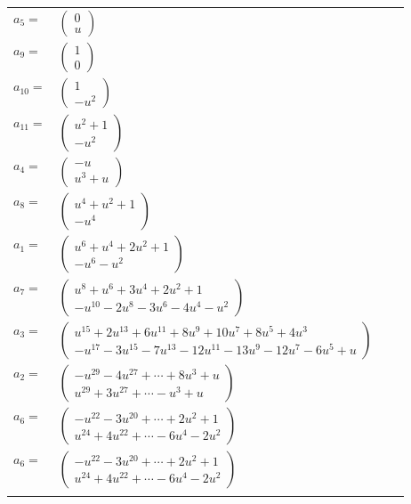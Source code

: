 \documentclass[1p]{elsarticle_modified}
\theoremstyle{definition}
\begin{document}
\begin{tabular}{m{7pt} m{180pt} m{7pt} m{180pt} }
\flushright $a_{5}=$&$\begin{pmatrix}0\\u\end{pmatrix}$ \\
\flushright $a_{9}=$&$\begin{pmatrix}1\\0\end{pmatrix}$ \\
\flushright $a_{10}=$&$\begin{pmatrix}1\\- u^2\end{pmatrix}$ \\
\flushright $a_{11}=$&$\begin{pmatrix}u^2+1\\- u^2\end{pmatrix}$ \\
\flushright $a_{4}=$&$\begin{pmatrix}- u\\u^3+u\end{pmatrix}$ \\
\flushright $a_{8}=$&$\begin{pmatrix}u^4+u^2+1\\- u^4\end{pmatrix}$ \\
\flushright $a_{1}=$&$\begin{pmatrix}u^6+u^4+2 u^2+1\\- u^6- u^2\end{pmatrix}$ \\
\flushright $a_{7}=$&$\begin{pmatrix}u^8+u^6+3 u^4+2 u^2+1\\- u^{10}-2 u^8-3 u^6-4 u^4- u^2\end{pmatrix}$ \\
\flushright $a_{3}=$&$\begin{pmatrix}u^{15}+2 u^{13}+6 u^{11}+8 u^9+10 u^7+8 u^5+4 u^3\\- u^{17}-3 u^{15}-7 u^{13}-12 u^{11}-13 u^9-12 u^7-6 u^5+u\end{pmatrix}$ \\
\flushright $a_{2}=$&$\begin{pmatrix}- u^{29}-4 u^{27}+\cdots+8 u^3+u\\u^{29}+3 u^{27}+\cdots- u^3+u\end{pmatrix}$ \\
\flushright $a_{6}=$&$\begin{pmatrix}- u^{22}-3 u^{20}+\cdots+2 u^2+1\\u^{24}+4 u^{22}+\cdots-6 u^4-2 u^2\end{pmatrix}$\\ \flushright $a_{6}=$&$\begin{pmatrix}- u^{22}-3 u^{20}+\cdots+2 u^2+1\\u^{24}+4 u^{22}+\cdots-6 u^4-2 u^2\end{pmatrix}$\\&\end{tabular}
\end{document}
